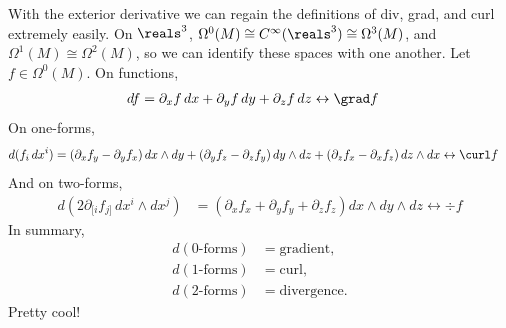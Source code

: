 \documentclass[11pt]{article}
\begin{document}
\begin{eexample}
    With the exterior derivative we can regain the definitions of
    div, grad, and curl extremely easily. On $\reals^3$, $\Omega^0(M)
    \cong C^\infty(\reals^3) \cong \Omega^3(M)$, and $\Omega^1(M) \cong \Omega^2(M)$,
    so we can identify these spaces with one another. Let $f \in \Omega^0(M)$.
    On functions, 
    \begin{align*}
        df & = \partial_x f \, dx + \partial_y f \, dy + \partial_z f \, dz \leftrightarrow \grad f
    \end{align*}
    On one-forms,
    \begin{align*}
        d(f_i \, dx^i) & = (\partial_x f_y - \partial_y f_x) \, dx \wedge dy + (\partial_y f_z - \partial_z f_y) \, dy \wedge dz + (\partial_z f_x - \partial_x f_z) \, dz \wedge dx \leftrightarrow \curl f
    \end{align*}
    And on two-forms,
    \begin{align*}
        d(2\partial_{[i} f_{j]} \, dx^i \wedge dx^j) & = \left( \partial_x f_x + \partial_y f_y + \partial_z f_z \right) dx \wedge dy \wedge dz \leftrightarrow \div f
    \end{align*}
    In summary,
    \begin{align*}
        d(0\text{-forms}) & = \text{gradient},\\
        d(1\text{-forms}) & = \text{curl},\\
        d(2\text{-forms}) & = \text{divergence}.
    \end{align*}
    Pretty cool!
\end{eexample}

\end{document}
